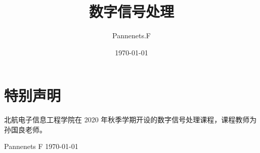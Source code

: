 \documentclass[cn,11pt,chinese,black,simple]{elegantbook}
\title{数字信号处理}
\author{Pannenets.F}
\date{\today}
\begin{document}
\maketitle
\frontmatter

\chapter*{特别声明}

北航电子信息工程学院在 2020 年秋季学期开设的数字信号处理课程，课程教师为孙国良老师。

% 

\begin{flushright}
Pannenets F
\today
\end{flushright}

\tableofcontents

\mainmatter















\end{document}
